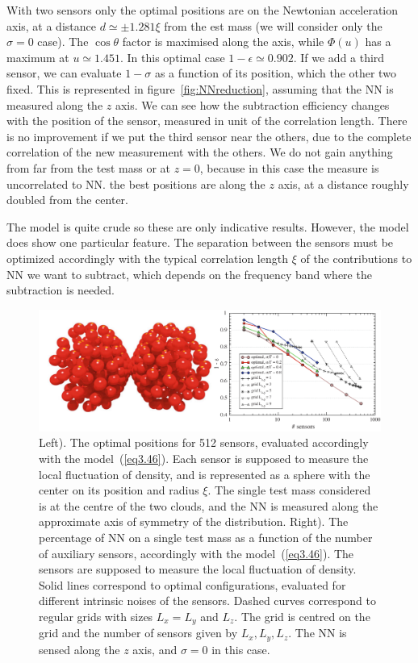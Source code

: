With two sensors only the optimal positions are on the Newtonian acceleration axis, at a distance $d\simeq \pm 1.281 \xi$ from the est mass (we will consider only the $\sigma=0$ case). The $\cos\theta$ factor is maximised along the axis, while $\Phi(u)$ has a maximum at $u\simeq1.451$. In this optimal case $1-\epsilon\simeq0.902$. If we add a third sensor, we can evaluate $1-\sigma$ as a function of its position, which the other two fixed. This is represented in figure~\ref{fig:NNreduction}, assuming that the NN is measured along the $z$ axis. We can see how the subtraction efficiency changes with the position of the sensor, measured in unit of the correlation length. There is no improvement if we put the third sensor near the others, due to the complete correlation of the new measurement with the others. We do not gain anything from far from the test mass or at $z=0$, because in this case the measure is uncorrelated to NN. the best positions are along the $z$ axis, at a distance roughly doubled from the center. 

The model is quite crude so these are only indicative results. However, the model does show one particular feature. The separation between the sensors must be optimized accordingly with the typical correlation length $\xi$ of the contributions to NN we want to subtract, which depends on the frequency band where the subtraction is needed. 	
\begin{figure}[t!]
	\begin{center}
		\includegraphics[width=16.5cm]{./Sec_SiteInfra/Figures/SimplOptSens2.pdf}
		\end{center}
		\caption{Left). The optimal positions for 512 sensors, evaluated accordingly with the model~(\ref{eq3.46}). Each sensor is supposed to measure the local fluctuation of density, and is represented as a sphere with the center on its position and radius $\xi$. The single test mass considered is at the centre of the two clouds, and the NN is measured along the approximate axis of symmetry of the distribution. Right). The percentage of NN on a single test mass as a function of the number of auxiliary sensors, accordingly with the model~(\ref{eq3.46}). The sensors are supposed to measure the local fluctuation of density. Solid lines correspond to optimal configurations, evaluated for different intrinsic noises of the sensors. Dashed curves correspond to regular grids with sizes $L_{x}=L_{y}$ and $L_{z}$. The grid is centred on the grid and the number of sensors given by $L_{x},L_{y},L_{z}$. The NN is sensed along the $z$ axis, and $\sigma=0$ in this case.}
\label{fig:OptimalPosition}
\end{figure}

